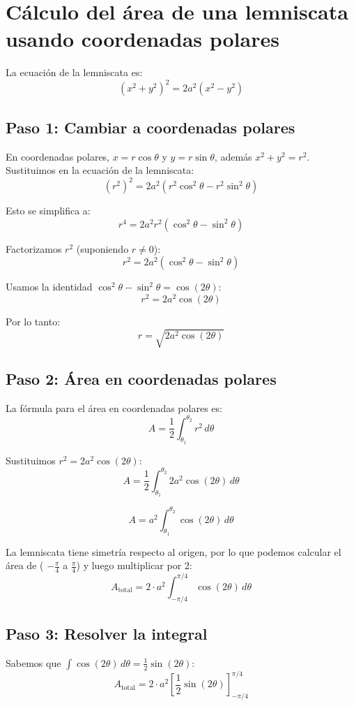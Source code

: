 \section*{Cálculo del área de una lemniscata usando coordenadas polares}

La ecuación de la lemniscata es:
\[
(x^2 + y^2)^2 = 2a^2(x^2 - y^2)
\]

\subsection*{Paso 1: Cambiar a coordenadas polares}

En coordenadas polares, \(x = r\cos\theta\) y \(y = r\sin\theta\), además \(x^2 + y^2 = r^2\). Sustituimos en la ecuación de la lemniscata:
\[
(r^2)^2 = 2a^2(r^2\cos^2\theta - r^2\sin^2\theta)
\]

Esto se simplifica a:
\[
r^4 = 2a^2r^2(\cos^2\theta - \sin^2\theta)
\]

Factorizamos \(r^2\) (suponiendo \(r \neq 0\)):
\[
r^2 = 2a^2(\cos^2\theta - \sin^2\theta)
\]

Usamos la identidad \(\cos^2\theta - \sin^2\theta = \cos(2\theta)\):
\[
r^2 = 2a^2\cos(2\theta)
\]

Por lo tanto:
\[
r = \sqrt{2a^2\cos(2\theta)}
\]

\subsection*{Paso 2: Área en coordenadas polares}

La fórmula para el área en coordenadas polares es:
\[
A = \frac{1}{2} \int_{\theta_1}^{\theta_2} r^2 \, d\theta
\]

Sustituimos \(r^2 = 2a^2\cos(2\theta)\):
\[
A = \frac{1}{2} \int_{\theta_1}^{\theta_2} 2a^2\cos(2\theta) \, d\theta
\]

\[
A = a^2 \int_{\theta_1}^{\theta_2} \cos(2\theta) \, d\theta
\]

La lemniscata tiene simetría respecto al origen, por lo que podemos calcular el área de  ( \(-\frac{\pi}{4}\) a \(\frac{\pi}{4}\)) y luego multiplicar por 2:
\[
A_{\text{total}} = 2 \cdot a^2 \int_{-\pi/4}^{\pi/4} \cos(2\theta) \, d\theta
\]

\subsection*{Paso 3: Resolver la integral}

Sabemos que \(\int \cos(2\theta) \, d\theta = \frac{1}{2} \sin(2\theta)\):
\[
A_{\text{total}} = 2 \cdot a^2 \left[ \frac{1}{2} \sin(2\theta) \right]_{-\pi/4}^{\pi/4}
\]

